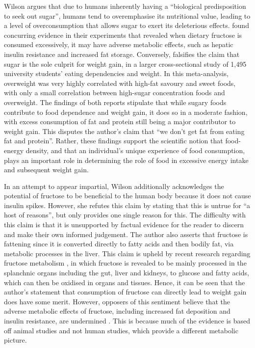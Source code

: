 \documentclass[12pt]{article}
\begin{document}
\bigskip
Wilson argues that due to humans inherently having a “biological predisposition to seek out sugar”, humans tend to overemphasise its nutritional value, leading to a level of overconsumption that allows sugar to exert its deleterious effects. \textcite{tappy} found concurring evidence in their experiments that revealed when dietary fructose is consumed excessively, it may have adverse metabolic effects, such as hepatic insulin resistance and increased fat storage. Conversely, \textcite{markus} falsifies the claim that sugar is the sole culprit for weight gain, in a larger cross-sectional study of 1,495 university students’ eating dependencies and weight. In this meta-analysis, overweight was very highly correlated with high-fat savoury and sweet foods, with only a small correlation between high-sugar concentration foods and overweight. The findings of both reports stipulate that while sugary foods contribute to food dependence and weight gain, it does so in a moderate fashion, with excess consumption of fat and protein still being a major contributor to weight gain. This disputes the author’s claim that “we don’t get fat from eating fat and protein”. Rather, these findings support the scientific notion that food-energy density, and that an individual’s unique experience of food consumption, plays an important role in determining the role of food in excessive energy intake and subsequent weight gain.

\bigskip
In an attempt to appear impartial, Wilson additionally acknowledges the potential of fructose to be beneficial to the human body because it does not cause insulin spikes. However, she refutes this claim by stating that this is untrue for “a host of reasons”, but only provides one single reason for this. The difficulty with this claim is that it is unsupported by factual evidence for the reader to discern and make their own informed judgement. The author also asserts that fructose is fattening since it is converted directly to fatty acids and then bodily fat, via metabolic processes in the liver. This claim is upheld by recent research regarding fructose metabolism \textcite{tappy}, in which fructose is revealed to be mainly processed in the splanchnic organs including the gut, liver and kidneys, to glucose and fatty acids, which can then be oxidised in organs and tissues. Hence, it can be seen that the author’s statement that consumption of fructose can directly lead to weight gain does have some merit. However, opposers of this sentiment believe that the adverse metabolic effects of fructose, including increased fat deposition and insulin resistance, are undermined \textcite{macdonald}. This is because much of the evidence is based off animal studies and not human studies, which provide a different metabolic picture.
\end{document}
